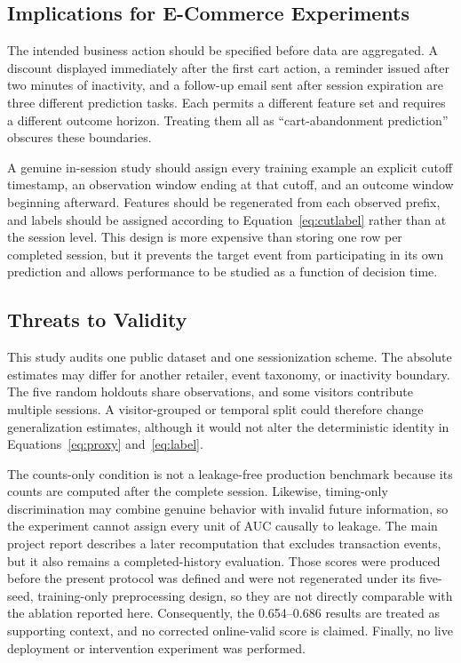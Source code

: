 \documentclass[conference, letterpaper]{IEEEtran}
\begin{document}
\subsection{Implications for E-Commerce Experiments}
The intended business action should be specified before data are aggregated. A discount displayed immediately after the first cart action, a reminder issued after two minutes of inactivity, and a follow-up email sent after session expiration are three different prediction tasks. Each permits a different feature set and requires a different outcome horizon. Treating them all as ``cart-abandonment prediction'' obscures these boundaries.

A genuine in-session study should assign every training example an explicit cutoff timestamp, an observation window ending at that cutoff, and an outcome window beginning afterward. Features should be regenerated from each observed prefix, and labels should be assigned according to Equation~\ref{eq:cutlabel} rather than at the session level. This design is more expensive than storing one row per completed session, but it prevents the target event from participating in its own prediction and allows performance to be studied as a function of decision time.

\subsection{Threats to Validity}
This study audits one public dataset and one sessionization scheme. The absolute estimates may differ for another retailer, event taxonomy, or inactivity boundary. The five random holdouts share observations, and some visitors contribute multiple sessions. A visitor-grouped or temporal split could therefore change generalization estimates, although it would not alter the deterministic identity in Equations~\ref{eq:proxy} and~\ref{eq:label}.

The counts-only condition is not a leakage-free production benchmark because its counts are computed after the complete session. Likewise, timing-only discrimination may combine genuine behavior with invalid future information, so the experiment cannot assign every unit of AUC causally to leakage. The main project report describes a later recomputation that excludes transaction events, but it also remains a completed-history evaluation. Those scores were produced before the present protocol was defined and were not regenerated under its five-seed, training-only preprocessing design, so they are not directly comparable with the ablation reported here. Consequently, the 0.654--0.686 results are treated as supporting context, and no corrected online-valid score is claimed. Finally, no live deployment or intervention experiment was performed.
\end{document}
